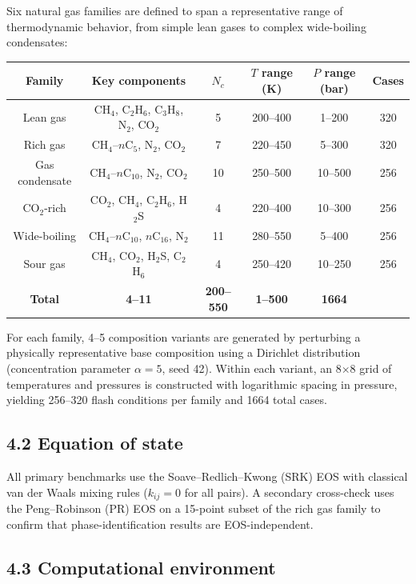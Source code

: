 \documentclass[review,3p]{custom}
\begin{document}
Six natural gas families are defined to span a representative range of thermodynamic
behavior, from simple lean gases to complex wide-boiling condensates:

\begin{table}[htbp]
\centering
\begin{tabular}{cccccc}
\toprule
Family & Key components & $N_c$ & $T$ range (K) & $P$ range (bar) & Cases \\
\midrule
Lean gas & CH$_4$, C$_2$H$_6$, C$_3$H$_8$, N$_2$, CO$_2$ & 5 & 200–400 & 1–200 & 320 \\
Rich gas & CH$_4$–$n$C$_5$, N$_2$, CO$_2$ & 7 & 220–450 & 5–300 & 320 \\
Gas condensate & CH$_4$–$n$C$_{10}$, N$_2$, CO$_2$ & 10 & 250–500 & 10–500 & 256 \\
CO$_2$-rich & CO$_2$, CH$_4$, C$_2$H$_6$, H$_2$S & 4 & 220–400 & 10–300 & 256 \\
Wide-boiling & CH$_4$–$n$C$_{10}$, $n$C$_{16}$, N$_2$ & 11 & 280–550 & 5–400 & 256 \\
Sour gas & CH$_4$, CO$_2$, H$_2$S, C$_2$H$_6$ & 4 & 250–420 & 10–250 & 256 \\
\textbf{Total} & \textbf{4–11} & \textbf{200–550} & \textbf{1–500} & \textbf{1664} \\
\bottomrule
\end{tabular}
\end{table}

For each family, 4–5 composition variants are generated by perturbing a physically
representative base composition using a Dirichlet distribution (concentration parameter
$\alpha = 5$, seed 42). Within each variant, an 8$\times$8 grid of temperatures and
pressures is constructed with logarithmic spacing in pressure, yielding 256–320 flash
conditions per family and 1664 total cases.

\subsection{4.2 Equation of state}

All primary benchmarks use the Soave–Redlich–Kwong (SRK) EOS with classical
van der Waals mixing rules ($k_{ij} = 0$ for all pairs). A secondary cross-check
uses the Peng–Robinson (PR) EOS on a 15-point subset of the rich gas family to
confirm that phase-identification results are EOS-independent.

\subsection{4.3 Computational environment}
\end{document}
